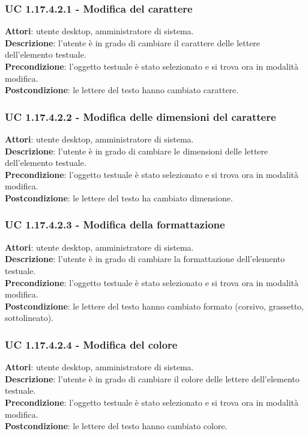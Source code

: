 \subsubsection{UC 1.17.4.2.1 - Modifica del carattere}{
	\label{uc1.17.4.2.1}
	\textbf{Attori}: utente desktop, amministratore di sistema. \\
	\textbf{Descrizione}: l'utente è in grado di cambiare il carattere delle lettere dell’elemento testuale. \\
	\textbf{Precondizione}: l'oggetto testuale è stato selezionato e si trova ora in modalità modifica.\\
	\textbf{Postcondizione}: le lettere del testo hanno cambiato carattere.	\\
	}
\subsubsection{UC 1.17.4.2.2 - Modifica delle dimensioni del carattere}{
	\label{uc1.17.4.2.2}
	\textbf{Attori}: utente desktop, amministratore di sistema. \\
	\textbf{Descrizione}: l'utente è in grado di cambiare le dimensioni delle lettere dell’elemento testuale. \\
	\textbf{Precondizione}: l'oggetto testuale è stato selezionato e si trova ora in modalità modifica.\\
	\textbf{Postcondizione}: le lettere del testo ha cambiato dimensione.	\\
	}
\subsubsection{UC 1.17.4.2.3 - Modifica della formattazione}{
	\label{uc1.17.4.2.3}
	\textbf{Attori}: utente desktop, amministratore di sistema. \\
	\textbf{Descrizione}: l'utente è in grado di cambiare la formattazione dell’elemento testuale. \\
	\textbf{Precondizione}: l'oggetto testuale è stato selezionato e si trova ora in modalità modifica.\\
	\textbf{Postcondizione}: le lettere del testo hanno cambiato formato (corsivo, grassetto, sottolineato).	\\
	}
\subsubsection{UC 1.17.4.2.4 - Modifica del colore}{
	\label{uc1.17.4.2.4}
	\textbf{Attori}: utente desktop, amministratore di sistema. \\
	\textbf{Descrizione}: l'utente è in grado di cambiare il colore delle lettere dell’elemento testuale. \\
	\textbf{Precondizione}: l'oggetto testuale è stato selezionato e si trova ora in modalità modifica.\\
	\textbf{Postcondizione}: le lettere del testo hanno cambiato colore.	\\
	}
